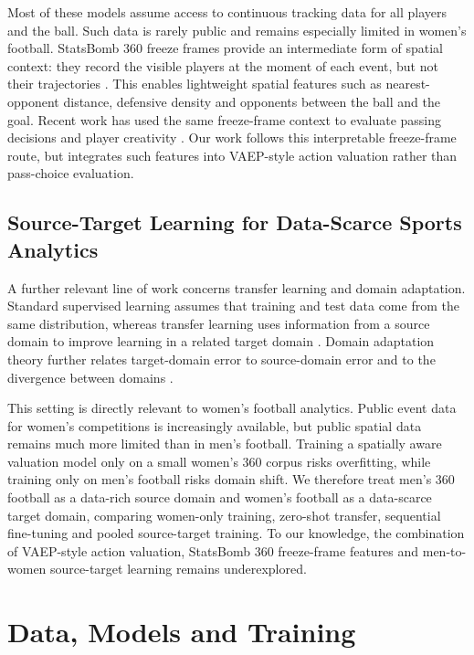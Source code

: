\documentclass[runningheads]{llncs}
\begin{document}
Most of these models assume access to continuous tracking data for all players and the ball. Such data is rarely public and remains especially limited in women's football. StatsBomb 360 freeze frames provide an intermediate form of spatial context: they record the visible players at the moment of each event, but not their trajectories \cite{statsbomb2021freezeframe}. This enables lightweight spatial features such as nearest-opponent distance,  defensive density and opponents between the ball and the goal. Recent work has used the same freeze-frame context to evaluate passing decisions and player creativity \cite{robberechts2023unxpass}. Our work follows this interpretable freeze-frame route, but integrates such features into VAEP-style action valuation rather than pass-choice evaluation.

\subsection{Source-Target Learning for Data-Scarce Sports Analytics}

A further relevant line of work concerns transfer learning and domain adaptation. Standard supervised learning assumes that training and test data come from the same distribution, whereas transfer learning uses information from a source domain to improve learning in a related target domain \cite{pan2010survey}. Domain adaptation theory further relates target-domain error to source-domain error and to the divergence between domains \cite{bendavid2010theory}.

This setting is directly relevant to women's football analytics. Public event data for women's competitions is increasingly available, but public spatial data remains much more limited than in men's football. Training a spatially aware valuation model only on a small women's 360 corpus risks overfitting, while training only on men's football risks domain shift. We therefore treat men's 360 football as a data-rich source domain and women's football as a data-scarce target domain, comparing women-only training, zero-shot transfer, sequential fine-tuning and pooled source-target training. To our knowledge, the combination of VAEP-style action valuation, StatsBomb 360 freeze-frame features and men-to-women source-target learning remains underexplored.

\section{Data, Models and Training}
\end{document}
